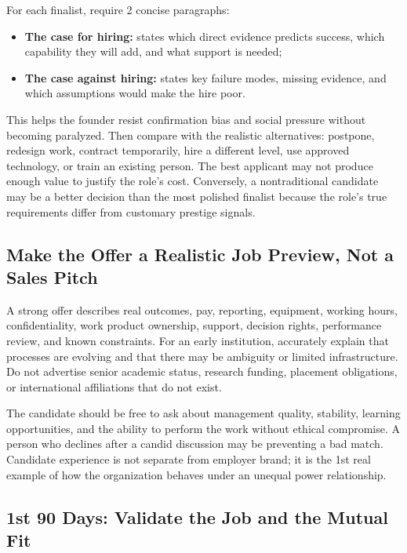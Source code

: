 For each finalist, require 2 concise paragraphs:
\begin{itemize}
    \item \textbf{The case for hiring:} states which direct evidence predicts success, which capability they will add, and what support is needed;
    \item \textbf{The case against hiring:} states key failure modes, missing evidence, and which assumptions would make the hire poor.
\end{itemize}

This helps the founder resist confirmation bias and social pressure without becoming paralyzed. Then compare with the realistic alternatives: postpone, redesign work, contract temporarily, hire a different level, use approved technology, or train an existing person. The best applicant may not produce enough value to justify the role's cost. Conversely, a nontraditional candidate may be a better decision than the most polished finalist because the role's true requirements differ from customary prestige signals.

\subsection{Make the Offer a Realistic Job Preview, Not a Sales Pitch}
\label{sec:realistic_job_preview}

A strong offer describes real outcomes, pay, reporting, equipment, working hours, confidentiality, work product ownership, support, decision rights, performance review, and known constraints. For an early institution, accurately explain that processes are evolving and that there may be ambiguity or limited infrastructure. Do not advertise senior academic status, research funding, placement obligations, or international affiliations that do not exist.

The candidate should be free to ask about management quality, stability, learning opportunities, and the ability to perform the work without ethical compromise. A person who declines after a candid discussion may be preventing a bad match. Candidate experience is not separate from employer brand; it is the 1st real example of how the organization behaves under an unequal power relationship.

\subsection{1st 90 Days: Validate the Job and the Mutual Fit}
\label{sec:first_ninety_days}


